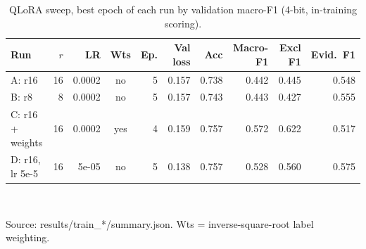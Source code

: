 \begin{table}[t]
\centering
\caption{QLoRA sweep, best epoch of each run by validation macro-F1 (4-bit, in-training scoring).}
\label{tab:sweep}
\footnotesize
\setlength{\tabcolsep}{4pt}
\begin{tabular}{lrrcr|rrrrr}
\toprule
Run & $r$ & LR & Wts & Ep. & Val loss & Acc & Macro-F1 & Excl F1 & Evid.\ F1 \\
\midrule
A: r16 & 16 & 0.0002 & no & 5 & 0.157 & 0.738 & 0.442 & 0.445 & 0.548 \\
B: r8 & 8 & 0.0002 & no & 5 & 0.157 & 0.743 & 0.443 & 0.427 & 0.555 \\
C: r16 + weights & 16 & 0.0002 & yes & 4 & 0.159 & 0.757 & 0.572 & 0.622 & 0.517 \\
D: r16, lr 5e-5 & 16 & 5e-05 & no & 5 & 0.138 & 0.757 & 0.528 & 0.560 & 0.575 \\
\bottomrule
\end{tabular}
\\[2pt]\parbox{0.95\linewidth}{\scriptsize Source: results/train\_*/summary.json. Wts = inverse-square-root label weighting.}
\end{table}
